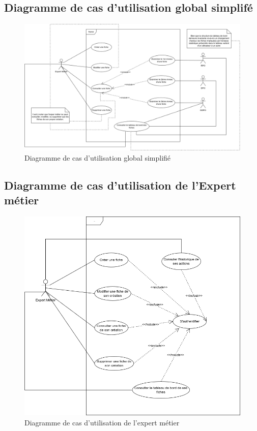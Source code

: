 \subsection{Diagramme de cas d'utilisation global simplifé}
\begin{figure}[H]
    \centering
    \includegraphics[width=\textwidth]{images/use-case.png}
    \caption{Diagramme de cas d'utilisation global simplifié}
\end{figure}


\subsection{Diagramme de cas d'utilisation de l'Expert métier}

\begin{figure}[H]
    \centering
    \includegraphics[width=\textwidth]{images/cas-utilisation-expert-metier.png}
    \caption{Diagramme de cas d'utilisation de l'expert métier}
\end{figure}

